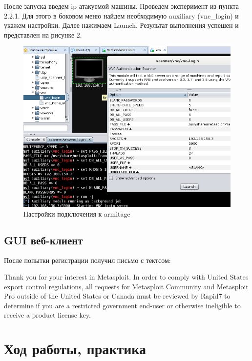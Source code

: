 \documentclass[11pt, a4paper]{article}		%
\begin{document}
После запуска введем ip атакуемой машины. Проведем эксперимент из пункта 2.2.1. Для этого в боковом меню найдем необходимую auxiliary (vnc\_login) и укажем настройки. Далее нажимаем Launch. Результат выполнения успешен и представлен на рисунке 2.


\begin{figure}[h!]
\centering
\includegraphics[scale=0.8]{res/armitage_settings}
\caption{Настройки подключения к armitage}
\end{figure}


\subsection{GUI веб-клиент}

После попытки регистрации получил письмо с тектсом:

Thank you for your interest in Metasploit. In order to comply with United States export control regulations, all requests for Metasploit Community and Metasploit Pro outside of the United States or Canada must be reviewed by Rapid7 to determine if you are a restricted government end-user or otherwise ineligible to receive a product license key.


\section{Ход работы, практика}
\end{document}
